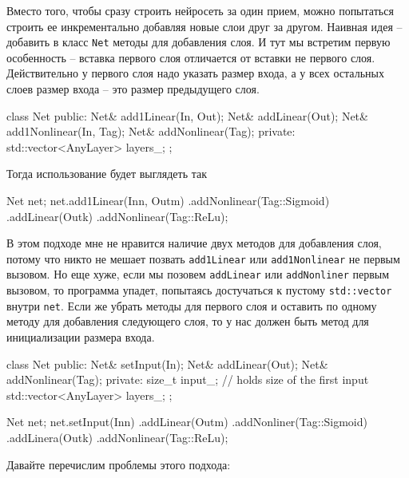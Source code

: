Вместо того, чтобы сразу строить нейросеть за один прием, можно попытаться строить ее инкрементально добавляя новые слои друг за другом.
Наивная идея -- добавить в класс \verb"Net" методы для добавления слоя.
И тут мы встретим первую особенность -- вставка первого слоя отличается от вставки не первого слоя.
Действительно у первого слоя надо указать размер входа, а у всех остальных слоев размер входа -- это размер предыдущего слоя.
\begin{cppcode}
class Net {
public:
  Net& add1Linear(In, Out);
  Net& addLinear(Out);
  Net& add1Nonlinear(In, Tag);
  Net& addNonlinear(Tag);
private:
  std::vector<AnyLayer> layers_;
};
\end{cppcode}
Тогда использование будет выглядеть так
\begin{cppcode}
Net net;
net.add1Linear(In{n}, Out{m})
   .addNonlinear(Tag::Sigmoid)
   .addLinear(Out{k})
   .addNonlinear(Tag::ReLu);
\end{cppcode}
В этом подходе мне не нравится наличие двух методов для добавления слоя, потому что никто не мешает позвать \verb"add1Linear" или \verb"add1Nonlinear" не первым вызовом.
Но еще хуже, если мы позовем \verb"addLinear" или \verb"addNonliner" первым вызовом, то программа упадет, попытаясь достучаться к пустому \verb"std::vector" внутри \verb"net".
Если же убрать методы для первого слоя и оставить по одному методу для добавления следующего слоя, то у нас должен быть метод для инициализации размера входа.
\begin{cppcode}
class Net {
public:
  Net& setInput(In);
  Net& addLinear(Out);
  Net& addNonlinear(Tag);
private:
  size_t input_; // holds size of the first input
  std::vector<AnyLayer> layers_;
};

Net net;
net.setInput(In{n})
   .addLinear(Out{m})
   .addNonliner(Tag::Sigmoid)
   .addLinera(Out{k})
   .addNonlinear(Tag::ReLu);
\end{cppcode}
Давайте перечислим проблемы этого подхода:
